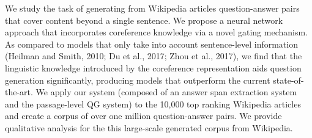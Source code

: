 We study the task of generating from Wikipedia articles question-answer pairs that cover content beyond a single sentence. We propose a neural network approach that incorporates coreference knowledge via a novel gating mechanism. As compared to models that only take into account sentence-level information (Heilman and Smith, 2010; Du et al., 2017; Zhou et al., 2017), we find that the linguistic knowledge introduced by the coreference representation aids question generation significantly, producing models that outperform the current state-of-the-art. We apply our system (composed of an answer span extraction system and the passage-level QG system) to the 10,000 top ranking Wikipedia articles and create a corpus of over one million question-answer pairs. We provide qualitative analysis for the this large-scale generated corpus from Wikipedia.
